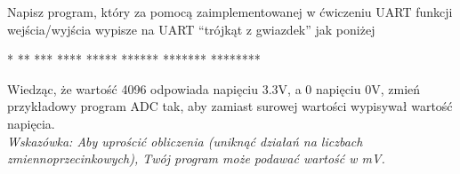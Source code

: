 \documentclass{pdfBooklets}
\begin{document}
\begin{ZadanieDomowe} [2pkt]
  Napisz program, który za pomocą zaimplementowanej w ćwiczeniu UART funkcji wejścia/wyjścia wypisze na UART
  ``trójkąt z gwiazdek'' jak poniżej
  
  \begin{CodeFrame*}[text]{}
    *
    **
    ***
    ****
    *****
    ******
    *******
    ********
  \end{CodeFrame*}
\end{ZadanieDomowe}

\begin{ZadanieDomowe} [3pkt]
  Wiedząc, że wartość 4096 odpowiada napięciu 3.3V, a 0 napięciu 0V, zmień przykładowy program ADC tak, aby zamiast surowej
  wartości wypisywał wartość napięcia.\\
  \textit{Wskazówka: Aby uprościć obliczenia (uniknąć działań na liczbach zmiennoprzecinkowych), Twój program może podawać wartość
    w mV.}
  
\end{ZadanieDomowe}

\end{document}
